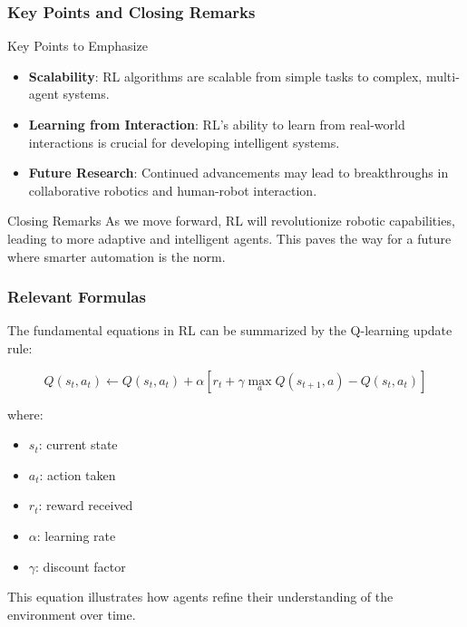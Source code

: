 \documentclass[aspectratio=169]{beamer}
\begin{document}
\begin{frame}[fragile]
    \frametitle{Key Points and Closing Remarks}
    \begin{block}{Key Points to Emphasize}
        \begin{itemize}
            \item \textbf{Scalability}: RL algorithms are scalable from simple tasks to complex, multi-agent systems.
            \item \textbf{Learning from Interaction}: RL's ability to learn from real-world interactions is crucial for developing intelligent systems.
            \item \textbf{Future Research}: Continued advancements may lead to breakthroughs in collaborative robotics and human-robot interaction.
        \end{itemize}
    \end{block}

    \begin{block}{Closing Remarks}
        As we move forward, RL will revolutionize robotic capabilities, leading to more adaptive and intelligent agents. This paves the way for a future where smarter automation is the norm.
    \end{block}
\end{frame}

\begin{frame}[fragile]
    \frametitle{Relevant Formulas}
    The fundamental equations in RL can be summarized by the Q-learning update rule:
    
    \begin{equation}
        Q(s_t, a_t) \leftarrow Q(s_t, a_t) + \alpha \left[ r_t + \gamma \max_{a} Q(s_{t+1}, a) - Q(s_t, a_t) \right]
    \end{equation}
    
    where:
    \begin{itemize}
        \item \( s_t \): current state
        \item \( a_t \): action taken
        \item \( r_t \): reward received
        \item \( \alpha \): learning rate
        \item \( \gamma \): discount factor
    \end{itemize}
    
    This equation illustrates how agents refine their understanding of the environment over time.
\end{frame}
\end{document}
